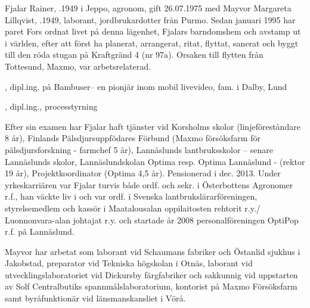 %



%
Fjalar Rainer, .1949 i Jeppo, agronom, gift 26.07.1975 med Mayvor Margareta Lillqvist, .1949, laborant, jordbrukardotter från Purmo. Sedan januari 1995 har paret Fors ordnat livet på denna lägenhet, Fjalars barndomshem och avstamp ut i världen, efter att först ha planerat, arrangerat, ritat, flyttat, sanerat och	byggt till den röda stugan på Kraftgränd 4 (nr 97a). Orsaken till flytten från Tottesund, Maxmo, var arbetsrelaterad.
\begin{jhchildren}
  \item {}, dipl.ing. på Bambuser– en pionjär inom mobil livevideo, fam. i Dalby, Lund
  \item {}, dipl.ing., processtyrning
\end{jhchildren}

Efter sin examen har Fjalar haft tjänster vid Korsholms skolor (linjeföreståndare 8 år), Finlands Pälsdjursuppfödares Förbund (Maxmo försöksfarm för pälsdjursforskning - farmchef 5 år), Lannäslunds lantbruksskolor -- senare Lannäslunds skolor, Lannäslundskolan Optima resp. Optima Lannäslund - (rektor 19 år), Projektkoordinator (Optima 4,5 år).	Pensionerad i dec. 2013. Under yrkeskarriären var Fjalar turvis både ordf. och sekr. i Österbottens Agronomer r.f., han väckte liv i och var ordf. i Svenska lantbrukslärarföreningen, styrelsemedlem och kassör i Maatalousalan oppilaitosten rehtorit r.y./ Luonnonvara-alan johtajat r.y. och startade år 2008 personalföreningen OptiPop r.f. på Lannäslund.

Mayvor har arbetat som laborant vid Schaumans fabriker och Östanlid sjukhus i Jakobstad, preparator vid Tekniska högskolan i Otnäs, laborant vid utvecklingslaboratoriet vid Dickursby färgfabriker och sakkunnig vid uppstarten av Solf Centralbutiks spannmålslaboratorium, kontorist på Maxmo Försöksfarm samt byråfunktionär vid länsmanskansliet i Vörå.

